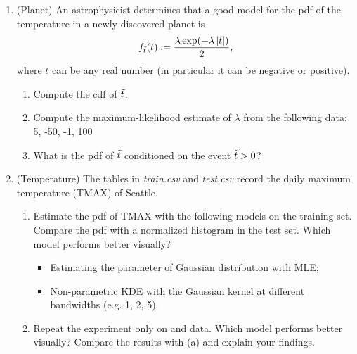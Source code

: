 \documentclass[12pt,twoside]{article}
\begin{document}
\begin{enumerate}
\item (Planet)
An astrophysicist determines that a good model for the pdf of the temperature in a newly discovered planet is
\begin{align}
f_{\tilde{ t }}(t) := \frac{\lambda \exp (-\lambda \left| t \right|)}{2},
\end{align}
where $t$ can be any real number (in particular it can be negative or positive).
\begin{enumerate}
\item Compute the cdf of $\tilde{ t }$.
\item Compute the maximum-likelihood estimate of $\lambda$ from the following data: 5, -50, -1, 100
\item What is the pdf of $\tilde{ t }$ conditioned on the event $\tilde{ t }>0$?
\end{enumerate}

\item(Temperature)
The tables in \textit{train.csv} and \textit{test.csv} record the daily maximum temperature (TMAX) of Seattle.
\begin{enumerate}
    \item Estimate the pdf of TMAX with the following models on the training set. Compare the pdf with a normalized histogram in the test set. Which model performs better visually?
        \begin{itemize} 
            \item Estimating the parameter of Gaussian distribution with MLE;
            \item Non-parametric KDE with the Gaussian kernel at different bandwidths (e.g. 1, 2, 5).
        \end{itemize}
    \item Repeat the experiment only on  and  data. Which model performs better visually? Compare the results with (a) and explain your findings. 
\end{enumerate}

\end{enumerate}
\end{document}
